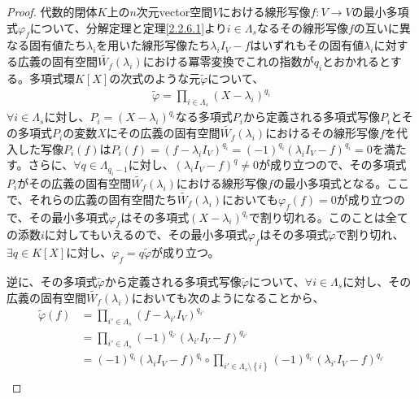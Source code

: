 \documentclass[dvipdfmx]{jsarticle}
\begin{document}
\begin{proof}
代数的閉体$K$上の$n$次元vector空間$V$における線形写像$f:V \rightarrow V$の最小多項式$\varphi_{f}$について、分解定理と定理\ref{2.2.6.1}より$i \in \varLambda_{s}$なるその線形写像$f$の互いに異なる固有値たち$\lambda_{i}$を用いた線形写像たち$\lambda_{i}I_{V} - f$はいずれもその固有値$\lambda_{i}$に対する広義の固有空間$\widetilde{W_{f}}\left( \lambda_{i} \right)$における冪零変換でこれの指数が$q_{i}$とおかれるとする。多項式環$K[ X]$の次式のような元$\widetilde{\varphi}$について、
\begin{align*}
\widetilde{\varphi} = \prod_{i \in \varLambda_{s}} \left( X - \lambda_{i} \right)^{q_{i}}
\end{align*}
$\forall i \in \varLambda_{s}$に対し、$P_{i} = \left( X - \lambda_{i} \right)^{q_{i}}$なる多項式$P_{i}$から定義される多項式写像$P_{i}$とその多項式$P_{i}$の変数$X$にその広義の固有空間$\widetilde{W_{f}}\left( \lambda_{i} \right)$におけるその線形写像$f$を代入した写像$P_{i}(f)$は$P_{i}(f) = \left( f - \lambda_{i}I_{V} \right)^{q_{i}} = ( - 1)^{q_{i}}\left( \lambda_{i}I_{V} - f \right)^{q_{i}} = 0$を満たす。さらに、$\forall q \in \varLambda_{q_{i} - 1}$に対し、$\left( \lambda_{i}I_{V} - f \right)^{q} \neq 0$が成り立つので、その多項式$P_{i}$がその広義の固有空間$\widetilde{W_{f}}\left( \lambda_{i} \right)$における線形写像$f$の最小多項式となる。ここで、それらの広義の固有空間たち$\widetilde{W_{f}}\left( \lambda_{i} \right)$においても$\varphi_{f}(f) = 0$が成り立つので、その最小多項式$\varphi_{f}$はその多項式$\left( X - \lambda_{i} \right)^{q_{i}}$で割り切れる。このことは全ての添数$i$に対してもいえるので、その最小多項式$\varphi_{f}$はその多項式$\widetilde{\varphi}$で割り切れ、$\exists q \in K[ X]$に対し、$\varphi_{f} = q\widetilde{\varphi}$が成り立つ。\par
逆に、その多項式$\widetilde{\varphi}$から定義される多項式写像$\widetilde{\varphi}$について、$\forall i \in \varLambda_{s}$に対し、その広義の固有空間$\widetilde{W_{f}}\left( \lambda_{i} \right)$においても次のようになることから、
\begin{align*}
\widetilde{\varphi}(f) &= \prod_{i' \in \varLambda_{s}} \left( f - \lambda_{i'}I_{V} \right)^{q_{i'}}\\
&= \prod_{i' \in \varLambda_{s}} {( - 1)^{q_{i'}}\left( \lambda_{i'}I_{V} - f \right)^{q_{i'}}}\\
&= ( - 1)^{q_{i}}\left( \lambda_{i}I_{V} - f \right)^{q_{i}} \circ \prod_{i' \in \varLambda_{s} \setminus \left\{ i \right\}} {( - 1)^{q_{i'}}\left( \lambda_{i'}I_{V} - f \right)^{q_{i'}}}\\

\end{align*}
\end{proof}
\end{document}
